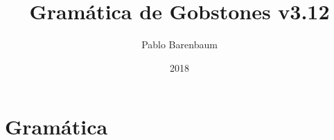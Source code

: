 \documentclass{article}
\begin{document}
\newcommand{\chr}[1]{\texttt{'}\textcolor{blue}{\texttt{#1}}\texttt{'}}
\newcommand{\str}[1]{\texttt{"}\textcolor{blue}{\texttt{#1}}\texttt{"}}
\newcommand{\token}[1]{\textcolor{red}{\texttt{#1}}}
\newcommand{\nonterminal}[1]{\textcolor{blue}{{\it$\langle$#1$\rangle$}}}
\newcommand{\nonEmpty}[1]{#1$_{1}$}
\newcommand{\production}[2]{
  \noindent
  \begin{tabular}{lrp{10cm}}
  #1 & $\xrightarrow{\hspace{.5cm}}$ & #2
  \end{tabular}\\
}
\newcommand{\EMPTY}{$\epsilon$}
\newcommand{\ALT}{
  \\ & $\mid$ &
}
\newcommand{\ALTA}{
  $\mid$
}
\newcommand{\TODO}[1]{\textcolor{red}{****#1****}}

\newcommand{\type}[1]{\textcolor{blue}{\texttt{#1}}}
\renewcommand{\ast}[1]{\textcolor{darkgreen}{\texttt{\underline{#1}}}}
\newcommand{\instruction}[1]{\textcolor{darkgreen}{\texttt{\underline{#1}}}}
\newcommand{\typedecl}[2]{\noindent
  \begin{tabularx}{\textwidth}{lrlr}
  #1 & $=$ & #2
  \end{tabularx}\\
}
\newcommand{\datadecl}[2]{\noindent
  \begin{tabularx}{\textwidth}{lrp{13cm}r}
  #1 & $::=$ & #2
  \end{tabularx}\\
}

\newcommand{\PUEDE}{{\bf PUEDE}\xspace}
\newcommand{\PUEDEN}{{\bf PUEDEN}\xspace}
\newcommand{\NOPUEDE}{{\bf NO PUEDE}\xspace}
\newcommand{\NOPUEDEN}{{\bf NO PUEDEN}\xspace}
\newcommand{\DEBE}{{\bf DEBE}\xspace}
\newcommand{\DEBEN}{{\bf DEBEN}\xspace}

\newcommand{\typename}[1]{\textcolor{blue}{\texttt{#1}}}
\newcommand{\constructorname}[1]{\textcolor{red}{\texttt{#1}}}
\newcommand{\fieldname}[1]{\textcolor{darkgreen}{\textit{#1}}}

\title{Gramática de Gobstones v3.12}
\author{Pablo Barenbaum}
\date{2018}

\maketitle

\tableofcontents

\section{Gram\'atica}
\end{document}
